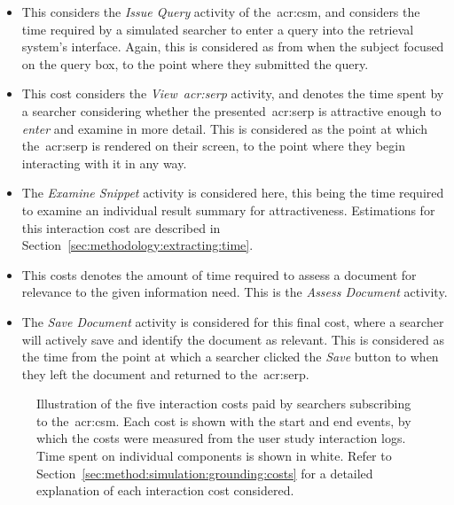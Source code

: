 \begin{itemize}
    \item{ This considers the \emph{Issue Query} activity of the~\gls{acr:csm}, and considers the time required by a simulated searcher to enter a query into the retrieval system's interface. Again, this is considered as from when the subject focused on the query box, to the point where they submitted the query.}
    \item{ This cost considers the \emph{View~\gls{acr:serp}} activity, and denotes the time spent by a searcher considering whether the presented~\gls{acr:serp} is attractive enough to \emph{enter} and examine in more detail. This is considered as the point at which the~\gls{acr:serp} is rendered on their screen, to the point where they begin interacting with it in any way.}
    \item{ The \emph{Examine Snippet} activity is considered here, this being the time required to examine an individual result summary for attractiveness. Estimations for this interaction cost are described in Section~\ref{sec:methodology:extracting:time}.}
    \item{ This costs denotes the amount of time required to assess a document for relevance to the given information need. This is the \emph{Assess Document} activity.}
    \item{ The \emph{Save Document} activity is considered for this final cost, where a searcher will actively save and identify the document as relevant. This is considered as the time from the point at which a searcher clicked the \emph{Save} button to when they left the document and returned to the~\gls{acr:serp}.}
\end{itemize}

\begin{figure}[t!]
    \centering
    \caption[Interaction costs illustrated throughout a search session]{Illustration of the five interaction costs paid by searchers subscribing to the~\gls{acr:csm}. Each cost is shown with the start and end events, by which the costs were measured from the user study interaction logs. Time spent on individual components is shown in white. Refer to Section~\ref{sec:method:simulation:grounding:costs} for a detailed explanation of each interaction cost considered.}
    \label{fig:costs}
\end{figure}

